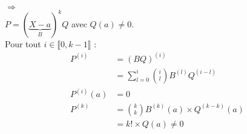 \documentclass[../main.tex]{subfiles}
\begin{document}
$\boxed{\Rightarrow}$ \\
$P = (\underbrace{X - a}_B)^k Q$ avec $Q(a) \neq 0$. \\
Pour tout $i \in \llbracket 0, k-1 \rrbracket$ : 
\begin{align*}
    P^{(i)} &= (BQ)^{(i)} \\
    &= \sum_{l=0}^{i} \binom{i}{l} B^{(l)} Q^{(i-l)} \\
    P^{(i)}(a) &= 0 \\
    P^{(k)} &= \binom{k}{k} B^{(k)}(a) \times Q^{(k-k)}(a) \\
    &= k! \times Q(a) \neq 0
\end{align*}
\end{document}
